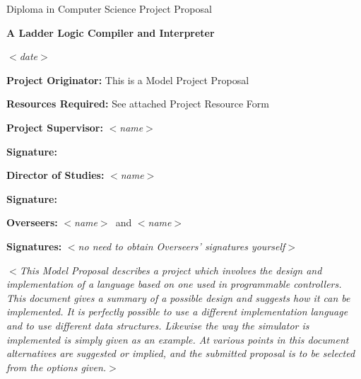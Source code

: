 \documentclass[12pt]{article}
\newcommand{\al}{$<$}
\newcommand{\ar}{$>$}
\begin{document}
\thispagestyle{empty}

\rightline{\large\al\emph{name}\ar}
\medskip
\rightline{\large\al\emph{College}\ar}
\medskip
\rightline{\large\al\emph{CRSID}\ar}

\vfil

\centerline{\large Diploma in Computer Science Project Proposal}
\vspace{0.4in}
\centerline{\Large\bf A Ladder Logic Compiler and Interpreter}
\vspace{0.3in}
\centerline{\large \al\emph{date}\ar}

\vfil

{\bf Project Originator:} This is a Model Project Proposal

\vspace{0.1in}

{\bf Resources Required:} See attached Project Resource Form

\vspace{0.5in}

{\bf Project Supervisor:} \al\emph{name}\ar

\vspace{0.2in}

{\bf Signature:}

\vspace{0.5in}

{\bf Director of Studies:}  \al\emph{name}\ar

\vspace{0.2in}

{\bf Signature:}

\vspace{0.5in}

{\bf Overseers:} \al\emph{name}\ar\ and \al\emph{name}\ar

\vspace{0.2in}

{\bf Signatures:} \al\emph{no need to obtain Overseers' signatures yourself}\ar

\vfil
\eject

\al\emph{This Model Proposal describes a project which involves the
  design and implementation of a language based on one used in
  programmable controllers. This document gives a summary of a
  possible design and suggests how it can be implemented.  It is
  perfectly possible to use a different implementation language and to
  use different data structures.  Likewise the way the simulator is
  implemented is simply given as an example.  At various points in
  this document\/ {\rm alternatives} are suggested or implied, and the
  submitted proposal is to be selected from the options given.}\ar
\end{document}

